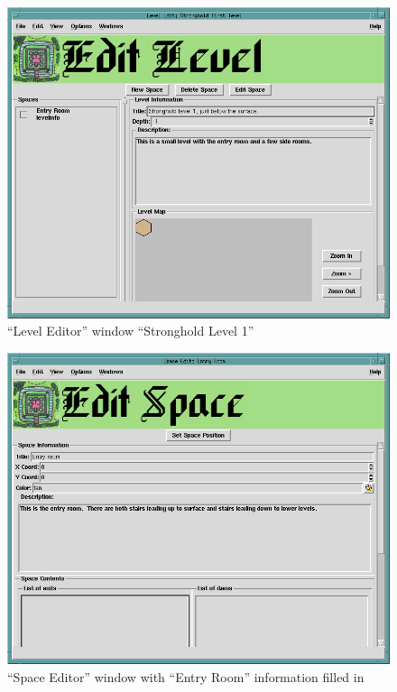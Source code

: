 \begin{figure}[hbpt]
\begin{centering}
\includegraphics[width=5in]{StrongholdLevel1.png}
\caption{``Level Editor'' window ``Stronghold Level 1''}
\label{fig:strongholdl1}
\end{centering}
\end{figure}
\begin{figure}[hbpt]
\begin{centering}
\includegraphics[width=5in]{EntryRoom.png}
\caption{``Space Editor'' window with ``Entry Room'' information
filled in}
\label{fig:entryroom}
\end{centering}
\end{figure}
